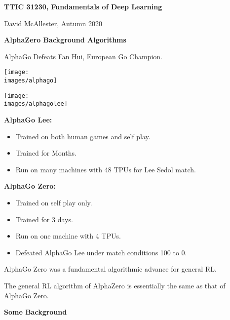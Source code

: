 




{\Huge

  \centerline{\bf TTIC 31230, Fundamentals of Deep Learning}
  \bigskip
  \centerline{David McAllester, Autumn 2020}


  \vfill
  \centerline{\bf AlphaZero Background Algorithms}
  \vfill
  \vfill          


AlphaGo Defeats Fan Hui, European Go Champion.

\vfill
\centerline{\texttt{[image: \\images/alphago]}}


\vfill
\centerline{\texttt{[image: \\images/alphagolee]}}


{\bf AlphaGo Lee:}

\begin{itemize}
\item Trained on both human games and self play.
  
\item Trained for Months.

\item Run on many machines with 48 TPUs for Lee Sedol match.
\end{itemize}

{\bf AlphaGo Zero:}
\begin{itemize}
\item Trained on self play only.
  
\item Trained for 3 days.

\item Run on one machine with 4 TPUs.

\item Defeated AlphaGo Lee under match conditions 100 to 0.
\end{itemize}


AlphaGo Zero was a fundamental algorithmic advance for general RL.

\vfill
The general RL algorithm of AlphaZero is essentially the same as that of AlphaGo Zero.


\slide{}

\centerline{\bf Some Background}

}
